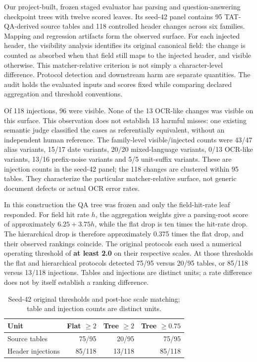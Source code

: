\documentclass[runningheads]{llncs}
\begin{document}
Our project-built, frozen staged evaluator has parsing and
question-answering checkpoint trees with twelve scored leaves. Its
seed-42 panel contains 95 TAT-QA-derived source tables \cite{r9} and 118
controlled header changes across six families. Mapping and regression
artifacts form the observed surface. For each injected header, the
visibility analysis identifies its original canonical field: the change
is counted as absorbed when that field still maps to the injected
header, and visible otherwise. This matcher-relative criterion is not
simply a character-level difference. Protocol detection and downstream
harm are separate quantities. The audit holds the evaluated inputs and
scores fixed while comparing declared aggregation and threshold
conventions.

Of 118 injections, 96 were visible. None of the 13 OCR-like changes was
visible on this surface. This observation does not establish 13 harmful
misses: one existing semantic judge classified the cases as
referentially equivalent, without an independent human reference. The
family-level visible/injected counts were 43/47 alias variants, 15/17
date variants, 20/20 mixed-language variants, 0/13 OCR-like variants,
13/16 prefix-noise variants and 5/5 unit-suffix variants. These are
injection counts in the seed-42 panel; the 118 changes are clustered
within 95 tables. They characterize the particular matcher-relative
surface, not generic document defects or actual OCR error rates.

In this construction the QA tree was frozen and only the field-hit-rate
leaf responded. For field hit rate \(h\), the aggregation weights give a
parsing-root score of approximately \(6.25 + 3.75h\), while the flat
drop is ten times the hit-rate drop. The hierarchical drop is therefore
approximately 0.375 times the flat drop, and their observed rankings
coincide. The original protocols each used a numerical operating
threshold of \textbf{at least 2.0} on their respective scales. At those
thresholds the flat and hierarchical protocols detected 75/95 versus
20/95 tables, or 85/118 versus 13/118 injections. Tables and injections
are distinct units; a rate difference does not by itself establish a
ranking difference.

\begin{table}[htbp]
\caption{Seed-42 original thresholds and post-hoc scale matching; table and injection counts are distinct units.}
\label{tab:original-detection}
\centering
\setlength{\tabcolsep}{4pt}
\begin{tabular}{lrrr}
\hline
Unit & Flat $\ge 2$ & Tree $\ge 2$ & Tree $\ge 0.75$ \\
\hline
Source tables & 75/95 & 20/95 & 75/95 \\
Header injections & 85/118 & 13/118 & 85/118 \\
\hline
\end{tabular}
\end{table}
\end{document}
